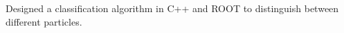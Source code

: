 \documentclass[letterpaper]{deedy-resume} %
\begin{document}
\begin{minipage}[t]{0.66\textwidth}
\sectionspace %



\begin{tightitemize}
\item Designed a classification algorithm in C++ and ROOT to distinguish between different particles.
\end{tightitemize}

\sectionspace %


  

%
%


%
%


\end{minipage} %
\end{document}
